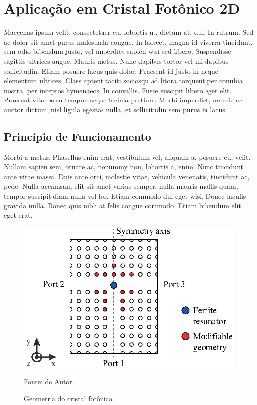 \section{Aplicação em Cristal Fotônico 2D}

Maecenas ipsum velit, consectetuer eu, lobortis ut, dictum at, dui. In rutrum. Sed ac dolor sit amet purus malesuada congue. In laoreet, magna id viverra tincidunt, sem odio bibendum justo, vel imperdiet sapien wisi sed libero. Suspendisse sagittis ultrices augue. Mauris metus. Nunc dapibus tortor vel mi dapibus sollicitudin. Etiam posuere lacus quis dolor. Praesent id justo in neque elementum ultrices. Class aptent taciti sociosqu ad litora torquent per conubia nostra, per inceptos hymenaeos. In convallis. Fusce suscipit libero eget elit. Praesent vitae arcu tempor neque lacinia pretium. Morbi imperdiet, mauris ac auctor dictum, nisl ligula egestas nulla, et sollicitudin sem purus in lacus.

\subsection{Princípio de Funcionamento}

Morbi a metus. Phasellus enim erat, vestibulum vel, aliquam a, posuere eu, velit. Nullam sapien sem, ornare ac, nonummy non, lobortis a, enim. Nunc tincidunt ante vitae massa. Duis ante orci, molestie vitae, vehicula venenatis, tincidunt ac, pede. Nulla accumsan, elit sit amet varius semper, nulla mauris mollis quam, tempor suscipit diam nulla vel leo. Etiam commodo dui eget wisi. Donec iaculis gravida nulla. Donec quis nibh at felis congue commodo. Etiam bibendum elit eget erat.

\begin{figure}[H]
    \centering
    \includegraphics{04-Figuras/PhotonicCrystal.eps}
    \caption{Geometria do cristal fotônico.} \par
    Fonte: do Autor.
    \label{figura: PhotonicCrystal}
\end{figure}

